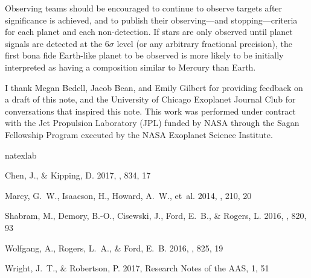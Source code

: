 \documentclass[rnaas]{aastex62}
\begin{document}
Observing teams should be encouraged to continue to observe targets after significance is achieved, and to publish their observing---and stopping---criteria for each planet and each non-detection. If stars are only observed until planet signals are detected at the 6$\sigma$ level (or any arbitrary fractional precision), the first bona fide Earth-like planet to be observed is more likely to be initially interpreted as having a composition similar to Mercury than Earth.




\acknowledgments

I thank Megan Bedell, Jacob Bean, and Emily Gilbert for providing feedback on a draft of this note, and the University of Chicago Exoplanet Journal Club for conversations that inspired this note. This work was performed under contract with the Jet Propulsion
Laboratory (JPL) funded by NASA through the Sagan Fellowship Program executed
by the NASA Exoplanet Science Institute.

\begin{thebibliography}{}
\expandafter\ifx\csname natexlab\endcsname\relax\def\natexlab#1{#1}\fi

{Chen}, J., \& {Kipping}, D. 2017, \apj, 834, 17

{Marcy}, G.~W., {Isaacson}, H., {Howard}, A.~W., {et~al.} 2014, \apjs, 210, 20

{Shabram}, M., {Demory}, B.-O., {Cisewski}, J., {Ford}, E.~B., \& {Rogers}, L.
  2016, \apj, 820, 93

{Wolfgang}, A., {Rogers}, L.~A., \& {Ford}, E.~B. 2016, \apj, 825, 19

Wright, J.~T., \& Robertson, P. 2017, Research Notes of the AAS, 1, 51

\end{thebibliography}
\end{document}
